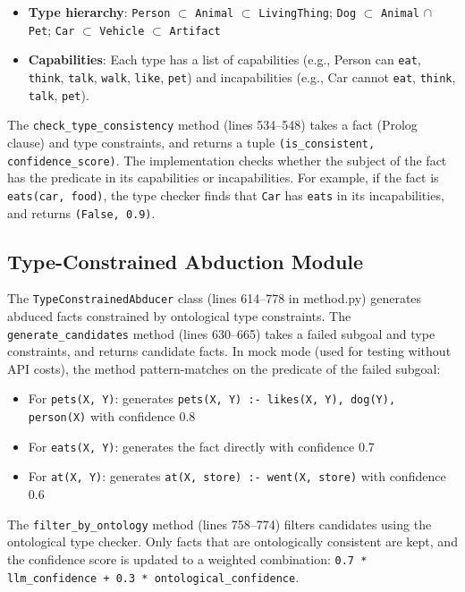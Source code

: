\documentclass[11pt,letterpaper]{article}
\begin{document}
\begin{itemize}
  \item \textbf{Type hierarchy}: \texttt{Person} $\subset$ \texttt{Animal} $\subset$ \texttt{LivingThing}; \texttt{Dog} $\subset$ \texttt{Animal} $\cap$ \texttt{Pet}; \texttt{Car} $\subset$ \texttt{Vehicle} $\subset$ \texttt{Artifact}
  \item \textbf{Capabilities}: Each type has a list of capabilities (e.g., Person can \texttt{eat}, \texttt{think}, \texttt{talk}, \texttt{walk}, \texttt{like}, \texttt{pet}) and incapabilities (e.g., Car cannot \texttt{eat}, \texttt{think}, \texttt{talk}, \texttt{pet}).
\end{itemize}

The \texttt{check\_type\_consistency} method (lines 534--548) takes a fact (Prolog clause) and type constraints, and returns a tuple \texttt{(is\_consistent, confidence\_score)}. The implementation checks whether the subject of the fact has the predicate in its capabilities or incapabilities. For example, if the fact is \texttt{eats(car, food)}, the type checker finds that \texttt{Car} has \texttt{eats} in its incapabilities, and returns \texttt{(False, 0.9)}.

\subsection{Type-Constrained Abduction Module}

The \texttt{TypeConstrainedAbducer} class (lines 614--778 in method.py) generates abduced facts constrained by ontological type constraints. The \texttt{generate\_candidates} method (lines 630--665) takes a failed subgoal and type constraints, and returns candidate facts. In mock mode (used for testing without API costs), the method pattern-matches on the predicate of the failed subgoal:

\begin{itemize}
  \item For \texttt{pets(X, Y)}: generates \texttt{pets(X, Y) :- likes(X, Y), dog(Y), person(X)} with confidence 0.8
  \item For \texttt{eats(X, Y)}: generates the fact directly with confidence 0.7
  \item For \texttt{at(X, Y)}: generates \texttt{at(X, store) :- went(X, store)} with confidence 0.6
\end{itemize}

The \texttt{filter\_by\_ontology} method (lines 758--774) filters candidates using the ontological type checker. Only facts that are ontologically consistent are kept, and the confidence score is updated to a weighted combination: \texttt{0.7 * llm\_confidence + 0.3 * ontological\_confidence}.
\end{document}
